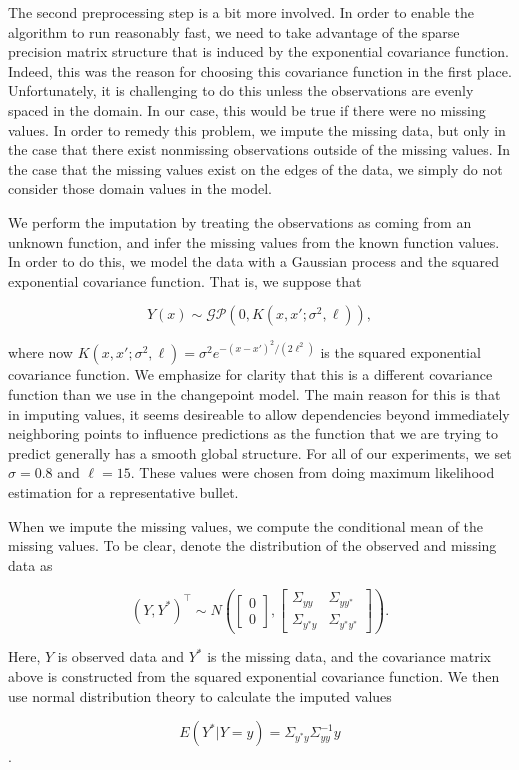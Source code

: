 \documentclass[12pt]{article}
\begin{document}
The second preprocessing step is a bit more involved. In order to enable
the algorithm to run reasonably fast, we need to take advantage of the
sparse precision matrix structure that is induced by the exponential
covariance function. Indeed, this was the reason for choosing this
covariance function in the first place. Unfortunately, it is challenging
to do this unless the observations are evenly spaced in the domain. In
our case, this would be true if there were no missing values. In order
to remedy this problem, we impute the missing data, but only in the case
that there exist nonmissing observations outside of the missing values.
In the case that the missing values exist on the edges of the data, we
simply do not consider those domain values in the model.

We perform the imputation by treating the observations as coming from an
unknown function, and infer the missing values from the known function
values. In order to do this, we model the data with a Gaussian process
and the squared exponential covariance function. That is, we suppose
that

\[
Y(x) \sim \mathcal{GP}(0, K(x,x';\sigma^2, \ell)),
\]

\noindent where now
\(K(x,x';\sigma^2, \ell) = \sigma^2 e^{-(x - x')^2/(2\ell^2)}\) is the
squared exponential covariance function. We emphasize for clarity that
this is a different covariance function than we use in the changepoint
model. The main reason for this is that in imputing values, it seems
desireable to allow dependencies beyond immediately neighboring points
to influence predictions as the function that we are trying to predict
generally has a smooth global structure. For all of our experiments, we
set \(\sigma = 0.8\) and \(\ell = 15\). These values were chosen from
doing maximum likelihood estimation for a representative bullet.

When we impute the missing values, we compute the conditional mean of
the missing values. To be clear, denote the distribution of the observed
and missing data as

\[ 
(Y,Y^*)^\top \sim N\left( \begin{bmatrix} 0 \\ 0 \end{bmatrix}, \begin{bmatrix} \Sigma_{yy} & \Sigma_{yy^*} \\ \Sigma_{y^*y} & \Sigma_{y^*y^*}\end{bmatrix} \right).
\]

\noindent Here, \(Y\) is observed data and \(Y^*\) is the missing data,
and the covariance matrix above is constructed from the squared
exponential covariance function. We then use normal distribution theory
to calculate the imputed values

\[ E(Y^*|Y = y) = \Sigma_{y^*y} \Sigma_{yy}^{-1}y \].



\end{document}
